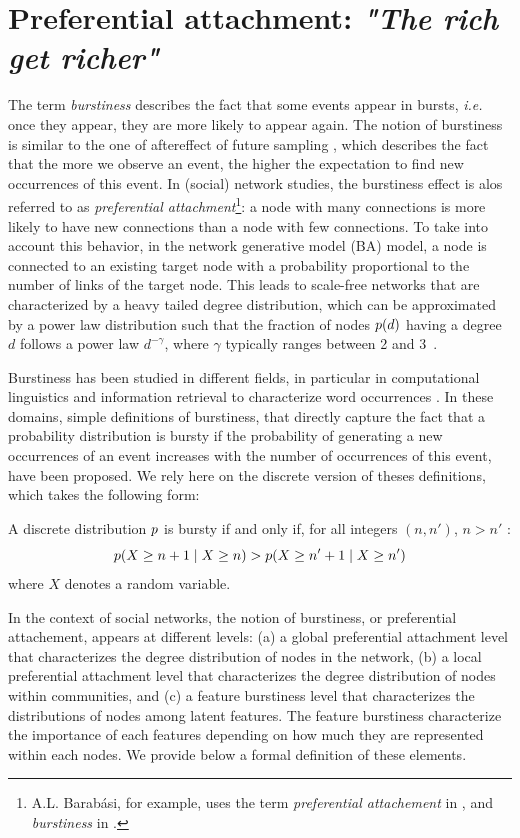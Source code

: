 \section{Preferential attachment: \emph{"The rich get richer"}}
\label{sec:burstiness}

The term \textit{burstiness} describes the fact that some events appear in bursts, \textit{i.e.} once they appear, they are more likely to appear again. The notion of burstiness is similar to the one of aftereffect of future sampling \cite{feller_68}, which describes the fact that the more we observe an event, the higher the expectation to find new occurrences of this event. In (social) network studies, the burstiness effect is alos referred to as \textit{preferential attachment}\footnote{A.L. Barab\'asi, for example, uses the term \textit{preferential attachement} in \cite{barabasi1999emergence}, and \textit{burstiness} in \cite{barabasi_burst}.}: a node with many connections is more likely to have new connections than a node with few connections. To take into account this behavior, in the network generative model  (BA) \cite{albert2002statistical} model, a node is connected to an existing target node with a probability proportional to the number of links of the target node. This leads to scale-free networks that are characterized by a heavy tailed degree distribution, which can be approximated by a power law distribution such that the fraction of nodes $p(d)$ having a degree $d$ follows a power law $d^{-\gamma}$, where $\gamma$ typically ranges between 2 and 3~\cite{barabasi1999emergence}. 

Burstiness has been studied in different fields, in particular in computational linguistics and information retrieval to characterize word occurrences \cite{church1995poisson}. In these domains, simple definitions of burstiness, that directly capture the fact that a probability distribution is bursty if the probability of generating a new occurrences of an event increases with the number of occurrences of this event, have been proposed\cite{clinchant2008bnb,clinchant2010information}. We rely here on the discrete version of theses definitions, which takes the following form:
%
\begin{definition}[Burstiness]
	A discrete distribution $p$ is bursty if and only if, for all integers $(n, n')$, $n > n'$ :
	\begin{equation}
	p(X \geq n+1 \mid X \geq n) > p(X \geq n'+1 \mid X \geq n') \nonumber
	\end{equation}
	where $X$ denotes a random variable.
\label{def:burst}
\end{definition}
%
In the context of social networks, the notion of burstiness, or preferential attachement, appears at different levels: (a) a global preferential attachment level that characterizes the degree distribution of nodes in the network, (b) a local preferential attachment level that characterizes the degree distribution of nodes within communities, and (c) a feature burstiness level that characterizes the distributions of nodes among latent features. The feature burstiness characterize the importance of each features depending on how much they are represented within each nodes. We provide below a formal definition of these elements.
%


